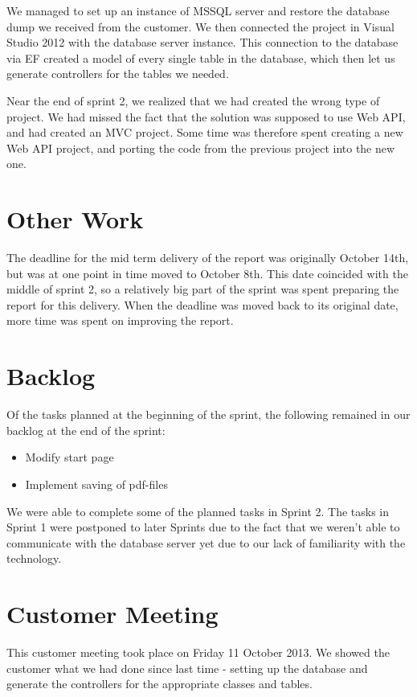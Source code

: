 We managed to set up an instance of MSSQL server and restore the database dump we received from the customer. We then connected the project in Visual Studio 2012 with the database server instance. This connection to the database via EF created a model of every single table in the database, which then let us generate controllers for the tables we needed.

Near the end of sprint 2, we realized that we had created the wrong type of project. We had missed the fact that the solution was supposed to use Web API, and had created an MVC project. Some time was therefore spent creating a new Web API project, and porting the code from the previous project into the new one.

\section{Other Work}
The deadline for the mid term delivery of the report was originally October 14th, but was at one point in time moved to October 8th. This date coincided with the middle of sprint 2, so a relatively big part of the sprint was spent preparing the report for this delivery. When the deadline was moved back to its original date, more time was spent on improving the report.

\section{Backlog}
Of the tasks planned at the beginning of the sprint, the following remained in our backlog at the end of the sprint:
\begin{itemize}
	\item Modify start page
	\item Implement saving of pdf-files
\end{itemize}
We were able to complete some of the planned tasks in Sprint 2. The tasks in Sprint 1 were postponed to later Sprints due to the fact that we weren't able to communicate with the database server yet due to our lack of familiarity with the technology.

\section{Customer Meeting}
This customer meeting took place on Friday 11 October 2013. We showed the customer what we had done since last time - setting up the database and generate the controllers for the appropriate classes and tables.

